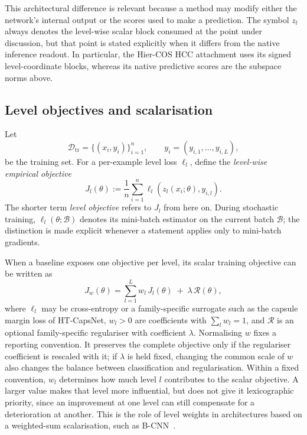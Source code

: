 This architectural difference is relevant because a method may modify either
the network's internal output or the scores used to make a prediction. The
symbol $z_l$ always denotes the level-wise scalar block consumed at the point
under discussion, but that point is stated explicitly when it differs from the
native inference readout. In particular, the Hier-COS HCC attachment uses its
signed level-coordinate blocks, whereas its native predictive scores are the
subspace norms above.

\subsection{Level objectives and scalarisation}
\label{ssec:problem_objective}

Let
\[
\mathcal{D}_{\mathrm{tr}}
=\bigl\{(x_i,y_i)\bigr\}_{i=1}^{n},
\qquad
y_i=(y_{i,1},\dots,y_{i,L}),
\]
be the training set. For a per-example level loss $\ell_l$, define the
\emph{level-wise empirical objective}
\begin{equation}
J_l(\theta)
:=
\frac{1}{n}\sum_{i=1}^{n}
\ell_l\!\left(z_l(x_i;\theta),y_{i,l}\right).
\label{eq:level_empirical_objective}
\end{equation}
The shorter term \emph{level objective} refers to $J_l$ from here on. During
stochastic training, $\ell_l(\theta;\mathcal{B})$ denotes its mini-batch
estimator on the current batch $\mathcal{B}$; the distinction is made explicit
whenever a statement applies only to mini-batch gradients.

When a baseline exposes one objective per level, its scalar training objective
can be written as
\[
J_{w}(\theta)
=
\sum_{l=1}^{L} w_l\,J_l(\theta)
\;+\;
\lambda\,\mathcal{R}(\theta),
\]
where $\ell_l$ may be cross-entropy or a family-specific
surrogate such as the capsule margin loss of HT-CapsNet, $w_l>0$ are
coefficients with $\sum_l w_l=1$, and $\mathcal{R}$ is an optional
family-specific regulariser with coefficient $\lambda$. Normalising $w$ fixes a
reporting convention. It preserves the complete objective only if the
regulariser coefficient is rescaled with it; if $\lambda$ is held fixed,
changing the common scale of $w$ also changes the balance between classification
and regularisation. Within a fixed convention, $w_l$ determines how much level
$l$ contributes to the scalar objective. A larger value makes that level more
influential, but does not give it lexicographic priority, since an improvement at
one level can still compensate for a deterioration at another. This is the role
of level weights in architectures based on a weighted-sum scalarisation, such as
B-CNN~\cite{zhu2017bcnn}.

